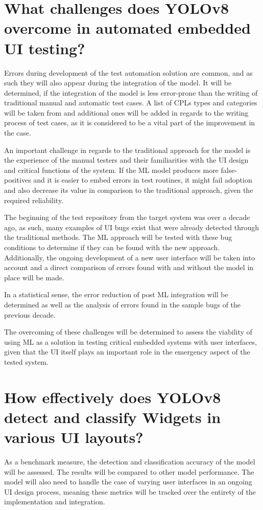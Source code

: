 \documentclass[Proposal,BIC,english,fhCitStyle,IEEE]{BASE/twbook} %
\begin{document}
\section{What challenges does YOLOv8 overcome in automated embedded UI testing?}
Errors during development of the test automation solution are common, and as such they will also appear during the integration of the model.
It will be determined, if the integration of the model is less error-prone than the writing of traditional manual and automatic test cases.
A list of CPLs types and categories will be taken from \autocite{alegrothVisualGUITesting2015} and additional ones will be added in regards to the writing process of test cases, as it is considered to be a vital part of the improvement in the case.

An important challenge in regards to the traditional approach for the model is the experience of the manual testers and their familiarities with the UI design and critical functions of the system.
If the ML model produces more false-positives and it is easier to embed errors in test routines, it might fail adoption and also decrease its value in comparison to the traditional approach, given the required reliability.

The beginning of the test repository from the target system was over a decade ago, as such, many examples of UI bugs exist that were already detected through the traditional methods.
The ML approach will be tested with these bug conditions to determine if they can be found with the new approach. Additionally, the ongoing development of a new user interface will be taken into account and a direct comparison of errors found with and without the model in place will be made.

In a statistical sense, the error reduction of post ML integration will be determined as well as the analysis of errors found in the sample bugs of the previous decade.

The overcoming of these challenges will be determined to assess the viability of using ML as a solution in testing critical embedded systems with user interfaces, given that the UI itself plays an important role in the emergency aspect of the tested system.

\section{How effectively does YOLOv8 detect and classify Widgets in various UI layouts?}
As a benchmark measure, the detection and classification accuracy of the model will be assessed. The results will be compared to other model performance.
The model will also need to handle the case of varying user interfaces in an ongoing UI design process, meaning these metrics will be tracked over the entirety of the implementation and integration.
\end{document}
